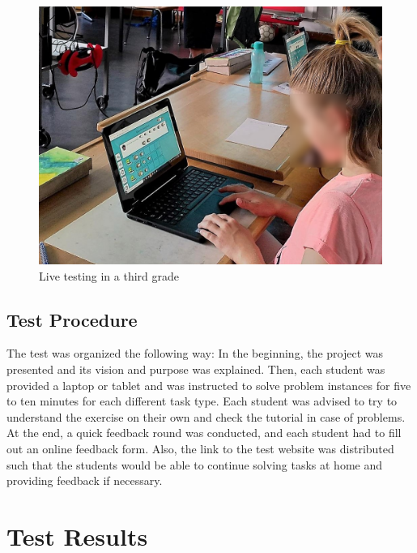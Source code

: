 \begin{figure}[H]
    \centering
    \includegraphics[width=1 \columnwidth]{figures/testing.png}
    \caption{Live testing in a third grade} 
    \label{fig:testing} 
\end{figure}

\subsection{Test Procedure}
The test was organized the following way: In the beginning, the project was presented and its vision and purpose was explained. Then, each student was provided a laptop or tablet and was instructed to solve problem instances for five to ten minutes for each different task type. Each student was advised to try to understand the exercise on their own and check the tutorial in case of problems. At the end, a quick feedback round was conducted, and each student had to fill out an online feedback form. Also, the link to the test website was distributed such that the students would be able to continue solving tasks at home and providing feedback if necessary.

\section{Test Results}
\label{section:results}

